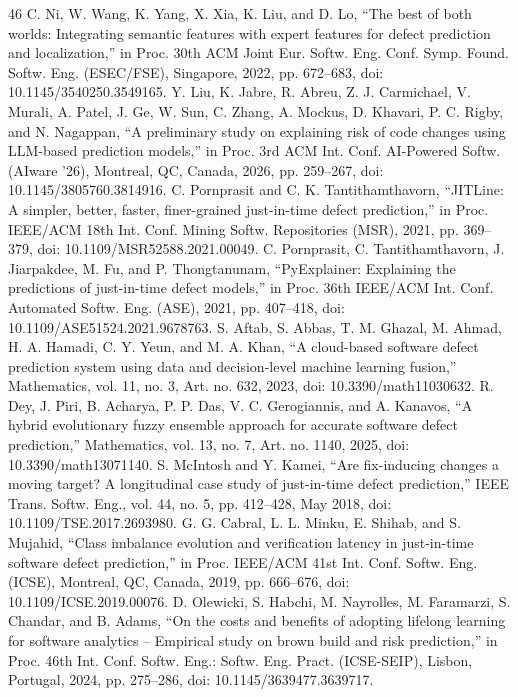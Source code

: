 \begin{thebibliography}{46}
 C. Ni, W. Wang, K. Yang, X. Xia, K. Liu, and D. Lo, ``The best of both worlds: Integrating semantic features with expert features for defect prediction and localization,'' in Proc. 30th ACM Joint Eur. Softw. Eng. Conf. Symp. Found. Softw. Eng. (ESEC/FSE), Singapore, 2022, pp. 672--683, doi: \mbox{10.1145/3540250.3549165}.
 Y. Liu, K. Jabre, R. Abreu, Z. J. Carmichael, V. Murali, A. Patel, J. Ge, W. Sun, C. Zhang, A. Mockus, D. Khavari, P. C. Rigby, and N. Nagappan, ``A preliminary study on explaining risk of code changes using LLM-based prediction models,'' in Proc. 3rd ACM Int. Conf. AI-Powered Softw. (AIware '26), Montreal, QC, Canada, 2026, pp. 259--267, doi: \mbox{10.1145/3805760.3814916}.
 C. Pornprasit and C. K. Tantithamthavorn, ``JITLine: A simpler, better, faster, finer-grained just-in-time defect prediction,'' in Proc. IEEE/ACM 18th Int. Conf. Mining Softw. Repositories (MSR), 2021, pp. 369--379, doi: \mbox{10.1109/MSR52588.2021.00049}.
 C. Pornprasit, C. Tantithamthavorn, J. Jiarpakdee, M. Fu, and P. Thongtanunam, ``PyExplainer: Explaining the predictions of just-in-time defect models,'' in Proc. 36th IEEE/ACM Int. Conf. Automated Softw. Eng. (ASE), 2021, pp. 407--418, doi: \mbox{10.1109/ASE51524.2021.9678763}.
 S. Aftab, S. Abbas, T. M. Ghazal, M. Ahmad, H. A. Hamadi, C. Y. Yeun, and M. A. Khan, ``A cloud-based software defect prediction system using data and decision-level machine learning fusion,'' Mathematics, vol. 11, no. 3, Art. no. 632, 2023, doi: \mbox{10.3390/math11030632}.
 R. Dey, J. Piri, B. Acharya, P. P. Das, V. C. Gerogiannis, and A. Kanavos, ``A hybrid evolutionary fuzzy ensemble approach for accurate software defect prediction,'' Mathematics, vol. 13, no. 7, Art. no. 1140, 2025, doi: \mbox{10.3390/math13071140}.
 S. McIntosh and Y. Kamei, ``Are fix-inducing changes a moving target? A longitudinal case study of just-in-time defect prediction,'' IEEE Trans. Softw. Eng., vol. 44, no. 5, pp. 412--428, May 2018, doi: \mbox{10.1109/TSE.2017.2693980}.
 G. G. Cabral, L. L. Minku, E. Shihab, and S. Mujahid, ``Class imbalance evolution and verification latency in just-in-time software defect prediction,'' in Proc. IEEE/ACM 41st Int. Conf. Softw. Eng. (ICSE), Montreal, QC, Canada, 2019, pp. 666--676, doi: \mbox{10.1109/ICSE.2019.00076}.
 D. Olewicki, S. Habchi, M. Nayrolles, M. Faramarzi, S. Chandar, and B. Adams, ``On the costs and benefits of adopting lifelong learning for software analytics -- Empirical study on brown build and risk prediction,'' in Proc. 46th Int. Conf. Softw. Eng.: Softw. Eng. Pract. (ICSE-SEIP), Lisbon, Portugal, 2024, pp. 275--286, doi: \mbox{10.1145/3639477.3639717}.

\end{thebibliography}

